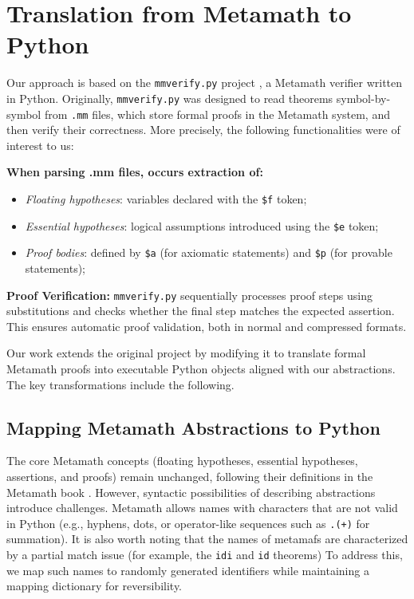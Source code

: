 \section{Translation from Metamath to Python}  
\hspace{\parindent}
Our approach is based on the \texttt{mmverify.py} project \cite{mmverify}, a Metamath verifier written in Python.
Originally, \texttt{mmverify.py} was designed to read theorems symbol-by-symbol from \texttt{.mm} files, which store
formal proofs in the Metamath system, and then verify their correctness. More precisely, the following
functionalities were of interest to us:

\textbf{When parsing .mm files, occurs extraction of:}
\begin{itemize}
    \item \textit{Floating hypotheses}: variables declared with the \texttt{\$f} token;
    \item \textit{Essential hypotheses}: logical assumptions introduced using the \texttt{\$e} token;
    \item \textit{Proof bodies}: defined by \texttt{\$a} (for axiomatic statements) and
    \texttt{\$p} (for provable statements);
\end{itemize}  

\textbf{Proof Verification:}  
\texttt{mmverify.py} sequentially processes proof steps using substitutions and checks whether the final step matches the expected assertion. This ensures automatic proof validation, both in normal and compressed formats.  

Our work extends the original project by modifying it to translate formal Metamath proofs into executable Python
objects aligned with our abstractions. The key transformations include the following.

\subsection{Mapping Metamath Abstractions to Python}  

The core Metamath concepts (floating hypotheses, essential hypotheses, assertions, and proofs) remain unchanged,
following their definitions in the Metamath book \cite{metamath}.
However, syntactic possibilities of describing abstractions introduce challenges. Metamath allows names with
characters that are not valid in Python (e.g., hyphens, dots, or operator-like sequences such as \texttt{.(+)} for
summation). It is also worth noting that the names of metamafs are characterized by a partial match issue (for
example, the \texttt{idi} and \texttt{id} theorems)
To address this, we map such names to randomly generated identifiers while maintaining a mapping dictionary for reversibility.  

